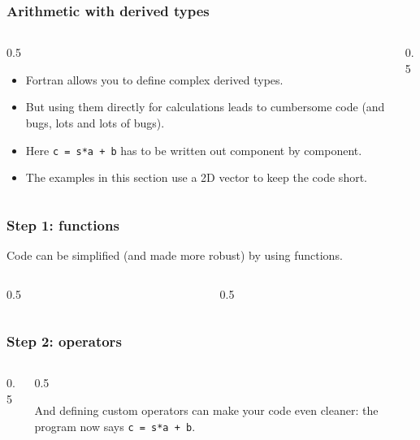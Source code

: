 \begin{frame}[fragile]
  \frametitle{Arithmetic with derived types}
  \begin{columns}[T]
    \begin{column}{0.5\textwidth}
      \begin{itemize}
        \item Fortran allows you to define complex derived types.
        \item But using them directly for calculations leads to cumbersome code (and bugs, lots and lots of bugs).
        \item Here \texttt{c = s*a + b} has to be written out component by component.
        \item The examples in this section use a 2D vector to keep the code short.
      \end{itemize}
    \end{column}

    \begin{column}{0.5\textwidth}
    
    
    \end{column}
  \end{columns}
\end{frame}

\begin{frame}[fragile]
  \frametitle{Step 1: functions}
   Code can be simplified (and made more robust) by using functions.
  \begin{columns}[T]
    \begin{column}{0.5\textwidth}
          
    \end{column}

    \begin{column}{0.5\textwidth}
    
    \end{column}
  \end{columns}
\end{frame}

\begin{frame}[fragile]
  \frametitle{Step 2: operators}
  \begin{columns}[T]
    \begin{column}{0.5\textwidth}
          
    \end{column}

    \begin{column}{0.5\textwidth}
    
    And defining custom operators can make your code even cleaner: the program now says \mbox{\texttt{c = s*a + b}}.
    \end{column}
  \end{columns}
\end{frame}


